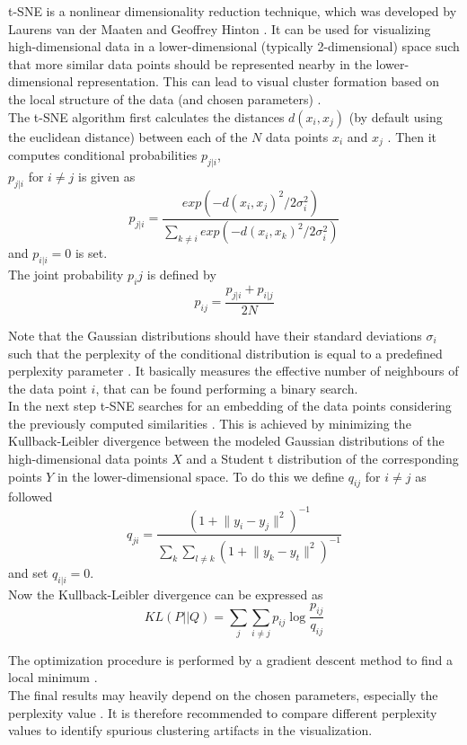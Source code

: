 
\acrfull{t-SNE} is a nonlinear dimensionality reduction technique, which was developed by Laurens van der Maaten and Geoffrey Hinton \cite{tsne}. It can be used for visualizing high-dimensional data in a lower-dimensional (typically 2-dimensional) space such that more similar data points should be represented nearby in the lower-dimensional representation. This can lead to visual cluster formation based on the local structure of the data (and chosen parameters) \cite{wattenberg2016how}.  \\
The t-SNE algorithm first calculates the distances $d(x_i, x_j)$ (by default using the euclidean distance) between each of the $N$ data points $x_i$ and $x_j$ \cite{tsne_matlab}. Then it computes conditional probabilities $p_{j|i}$, \cite{tsne} \\
$p_{j|i}$ for $i \neq j$ is given as
\begin{equation}
	p_{j|i} = \frac{exp(-d(x_i, x_j)^2 / 2\sigma_i^2)}{\sum_{k \neq i} exp(-d(x_i, x_k)^2 / 2\sigma_i^2)} 
\end{equation}
and $p_{i|i} = 0$ is set. \\
The joint probability $p_ij$ is defined by 
\begin{equation}
	p_{ij} = \frac{p_{j|i} + p_{i|j}}{2N}
\end{equation}

Note that the Gaussian distributions should have their standard deviations $\sigma_i$ such that the perplexity of the conditional distribution is equal to a predefined perplexity parameter \cite{tsne_matlab}. It basically measures the effective number of neighbours of the data point $i$, that can be found performing a binary search.   \\
In the next step t-SNE searches for an embedding of the data points considering the previously computed similarities \cite{tsne_matlab}. This is achieved by minimizing the Kullback-Leibler divergence between the modeled Gaussian distributions of the high-dimensional data points $X$ and a Student t distribution of the corresponding points $Y$ in the lower-dimensional space. To do this we define $q_{ij}$ for $i \neq j$ as followed 
\begin{equation}
	q_{ji} = \frac{(1 + \lVert y_i - y_j \rVert ^2)^{-1}}{\sum_{k}\sum_{l \neq k} (1 + \lVert y_k - y_t \rVert ^2)^{-1}}
\end{equation}
and set $q_{i|i} = 0$. \\
Now the Kullback-Leibler divergence can be expressed as \\
\begin{equation}
	KL(P||Q) = \sum_{j}\sum_{i \neq j}p_{ij}\log\frac{p_{ij}}{q_{ij}}
\end{equation}

The optimization procedure is performed by a gradient descent method to find a local minimum \cite{tsne_matlab}. \\
The final results may heavily depend on the chosen parameters, especially the perplexity value \cite{wattenberg2016how}. It is therefore recommended to compare different perplexity values to identify spurious clustering artifacts in the visualization.
